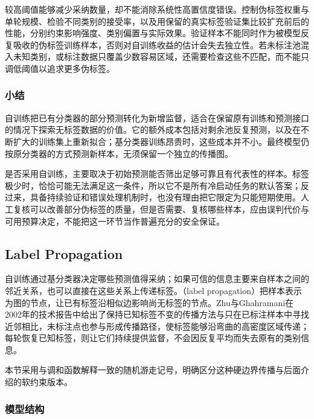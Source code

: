 较高阈值能够减少采纳数量，却不能消除系统性高置信度错误。控制伪标签权重与单轮规模、检验不同类别的接受率，以及用保留的真实标签验证集比较扩充前后的性能，分别约束影响强度、类别偏置与实际效果。验证样本不能同时作为被模型反复吸收的伪标签训练样本，否则对自训练收益的估计会失去独立性。若未标注池混入未知类别，或标注数据只覆盖少数容易区域，还需要检查这些不匹配，而不能只调低阈值以追求更多伪标签。

\subsubsection{小结}
\label{sec:classification-self-training-summary}

自训练把已有分类器的部分预测转化为新增监督，适合在保留原有训练和预测接口的情况下探索无标签数据的价值。它的额外成本包括对剩余池反复预测，以及在不断扩大的训练集上重新拟合；基分类器训练昂贵时，这些成本并不小。最终模型仍按原分类器的方式预测新样本，无须保留一个独立的传播图。

是否采用自训练，主要取决于初始预测能否筛出足够可靠且有代表性的样本。标签极少时，恰恰可能无法满足这一条件，所以它不是所有冷启动任务的默认答案；反过来，具备持续验证和错误处理机制时，也没有理由把它限定为只能短期使用。人工复核可以改善部分伪标签的质量，但是否需要、复核哪些样本，应由误判代价与可用预算决定，不能把这一环节当作普遍充分的安全保证。

\subsection{Label Propagation}
\label{sec:classification-label-propagation}

自训练通过基分类器决定哪些预测值得采纳；如果可信的信息主要来自样本之间的邻近关系，也可以直接在这些关系上传递标签。（label propagation）把样本表示为图的节点，让已有标签沿相似边影响尚无标签的节点。Zhu与Ghahramani在2002年的技术报告中给出了保持已知标签不变的传播方法与只在已标注样本中寻找近邻相比，未标注点也参与形成传播路径，使标签能够沿弯曲的高密度区域传递；每轮恢复已知标签，则让它们持续提供监督，不会因反复平均而失去原有的类别信息。

本节采用与调和函数解释一致的随机游走记号，明确区分这种硬边界传播与后面介绍的软约束版本。

\subsubsection{模型结构}
\label{sec:classification-label-propagation-structure}


